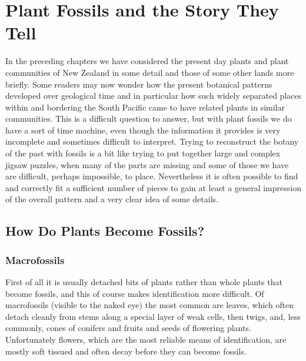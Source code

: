 \chapter{Plant Fossils and the Story They Tell}%
\label{ch:plantfossils}

In the preceding chapters we have considered the present day plants and plant communities of New Zealand in some detail and those of some other lands more briefly.
Some readers may now wonder how the present botanical patterns developed over geological time and in particular how such widely separated places within and bordering the South Pacific came to have related plants in similar communities.
This is a difficult question to answer, but with plant fossils we do have a sort of time machine, even though the information it provides is very incomplete and sometimes difficult to interpret.
Trying to reconstruct the botany of the past with fossils is a bit like trying to put together large and complex jigsaw puzzles, when many of the parts are missing and some of those we have are difficult, perhaps impossible, to place.
Nevertheless it is often possible to find and correctly fit a sufficient number of pieces to gain at least a general impression of the overall pattern and a very clear idea of some details.

\section{How Do Plants Become Fossils?}

\subsection{Macrofossils}

First of all it is usually detached bits of plants rather than whole plants that become fossils, and this of course makes identification more difficult.
Of macrofossils (visible to the naked eye) the most common are leaves, which often detach cleanly from stems along a special layer of weak cells, then twigs, and, less commonly, cones of conifers and fruits and seeds of flowering plants.
Unfortunately flowers, which are the most reliable means of identification, are mostly soft tissued and often decay before they can become fossils.

